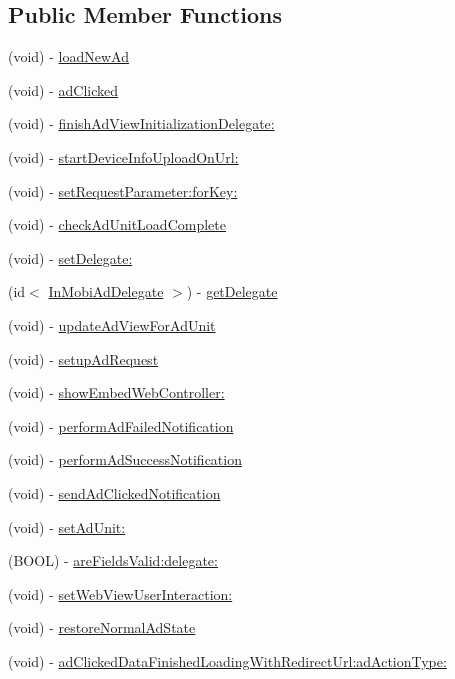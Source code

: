 \subsection*{Public Member Functions}
\begin{DoxyCompactItemize}
\item 
(void) -\/ \hyperlink{interface_in_mobi_ad_manager_a473b88b988e0757eb03abd3bebf870da}{loadNewAd}
\item 
(void) -\/ \hyperlink{interface_in_mobi_ad_manager_a5bc8a898a545a4d150b62d9ee9a98f9a}{adClicked}
\item 
(void) -\/ \hyperlink{interface_in_mobi_ad_manager_aca6b08a236c2ff698a3b4fbc9b5a3401}{finishAdViewInitializationDelegate:}
\item 
(void) -\/ \hyperlink{interface_in_mobi_ad_manager_adbafd353b03f00808d15bba171f323ce}{startDeviceInfoUploadOnUrl:}
\item 
(void) -\/ \hyperlink{interface_in_mobi_ad_manager_ae98133cf3664ff85167c6a824d7f918d}{setRequestParameter:forKey:}
\item 
(void) -\/ \hyperlink{interface_in_mobi_ad_manager_ad925a8d6aee5dbbc3090987fa6a9510c}{checkAdUnitLoadComplete}
\item 
(void) -\/ \hyperlink{interface_in_mobi_ad_manager_ab85928de22ce5fa57d6d192266bcc84a}{setDelegate:}
\item 
(id$<$ \hyperlink{protocol_in_mobi_ad_delegate-p}{InMobiAdDelegate} $>$) -\/ \hyperlink{interface_in_mobi_ad_manager_a98bd21c7d831e1551979af8444090c0b}{getDelegate}
\item 
(void) -\/ \hyperlink{interface_in_mobi_ad_manager_acba6d2e99c7a62541c8d4fee81883fed}{updateAdViewForAdUnit}
\item 
(void) -\/ \hyperlink{interface_in_mobi_ad_manager_a8f2697a753fd481749f8d3bd3832c9f4}{setupAdRequest}
\item 
(void) -\/ \hyperlink{interface_in_mobi_ad_manager_afb064845376b6ca71f190425045158c8}{showEmbedWebController:}
\item 
(void) -\/ \hyperlink{interface_in_mobi_ad_manager_a804ec536ceced3adeb992cee138da772}{performAdFailedNotification}
\item 
(void) -\/ \hyperlink{interface_in_mobi_ad_manager_a4a3a4a7197a6477ddfd00fb555404d91}{performAdSuccessNotification}
\item 
(void) -\/ \hyperlink{interface_in_mobi_ad_manager_afdf45782b03eefb782dee152454e1f01}{sendAdClickedNotification}
\item 
(void) -\/ \hyperlink{interface_in_mobi_ad_manager_adbdbbd62bb6b7a18114a81e669a17369}{setAdUnit:}
\item 
(BOOL) -\/ \hyperlink{interface_in_mobi_ad_manager_a99f9a580a2aab19b81106c3ed1268126}{areFieldsValid:delegate:}
\item 
(void) -\/ \hyperlink{interface_in_mobi_ad_manager_aa8aa167b7eb6e5b4e889d34689e03bc4}{setWebViewUserInteraction:}
\item 
(void) -\/ \hyperlink{interface_in_mobi_ad_manager_ac1cf97341c617bc2fbd4d91b6bb21d0d}{restoreNormalAdState}
\item 
(void) -\/ \hyperlink{interface_in_mobi_ad_manager_acdcc27bd1eea1c3d1de0969ef98004c9}{adClickedDataFinishedLoadingWithRedirectUrl:adActionType:}
\end{DoxyCompactItemize}
